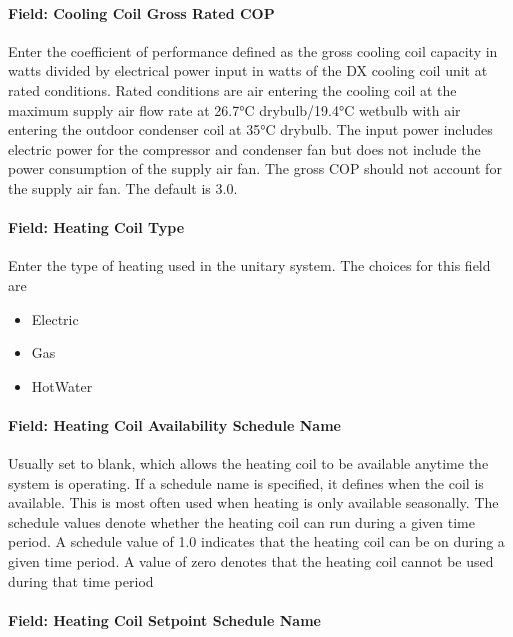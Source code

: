 \paragraph{Field: Cooling Coil Gross Rated COP}\label{field-cooling-coil-gross-rated-cop-4}

Enter the coefficient of performance defined as the gross cooling coil capacity in watts divided by electrical power input in watts of the DX cooling coil unit at rated conditions. Rated conditions are air entering the cooling coil at the maximum supply air flow rate at 26.7°C drybulb/19.4°C wetbulb with air entering the outdoor condenser coil at 35°C drybulb. The input power includes electric power for the compressor and condenser fan but does not include the power consumption of the supply air fan. The gross COP should not account for the supply air fan. The default is 3.0.

\paragraph{Field: Heating Coil Type}\label{field-heating-coil-type-5}

Enter the type of heating used in the unitary system. The choices for this field are

\begin{itemize}
\item
  Electric
\item
  Gas
\item
  HotWater
\end{itemize}

\paragraph{Field: Heating Coil Availability Schedule Name}\label{field-heating-coil-availability-schedule-name-5}

Usually set to blank, which allows the heating coil to be available anytime the system is operating. If a schedule name is specified, it defines when the coil is available. This is most often used when heating is only available seasonally. The schedule values denote whether the heating coil can run during a given time period. A schedule value of 1.0 indicates that the heating coil can be on during a given time period. A value of zero denotes that the heating coil cannot be used during that time period

\paragraph{Field: Heating Coil Setpoint Schedule Name}\label{field-heating-coil-setpoint-schedule-name-1}

